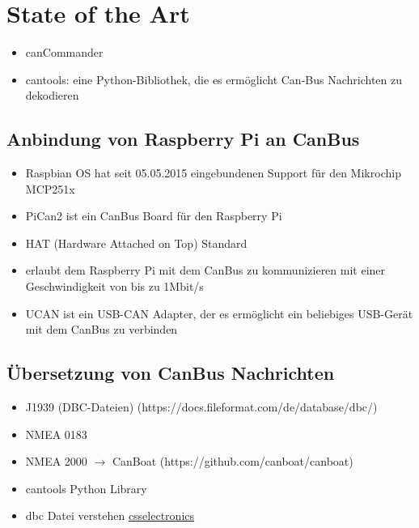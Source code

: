 \section{State of the Art}
\begin{itemize}
    \item canCommander
    \item cantools: eine Python-Bibliothek, die es ermöglicht Can-Bus Nachrichten zu dekodieren
\end{itemize}
\subsection{Anbindung von Raspberry Pi an CanBus}
\begin{itemize}
    \item Raspbian OS hat seit 05.05.2015 eingebundenen Support für den Mikrochip MCP251x
\end{itemize}
\cite{Salunkhe2016}
\begin{itemize}
    \item PiCan2 ist ein CanBus Board für den Raspberry Pi
    \item HAT (Hardware Attached on Top) Standard
    \item erlaubt dem Raspberry Pi mit dem CanBus zu kommunizieren mit einer Geschwindigkeit von bis zu 1Mbit/s
    \item UCAN ist ein USB-CAN Adapter, der es ermöglicht ein beliebiges USB-Gerät mit dem CanBus zu verbinden
\end{itemize}
\cite{Pant2019}
\subsection{Übersetzung von CanBus Nachrichten}
\begin{itemize}
    \item J1939 (DBC-Dateien) (https://docs.fileformat.com/de/database/dbc/)
    \item NMEA 0183 
    \item NMEA 2000 $\rightarrow$ CanBoat (https://github.com/canboat/canboat)
    \item cantools Python Library 
    \item dbc Datei verstehen \href{https://www.csselectronics.com/pages/can-dbc-file-database-intro}{csselectronics}
\end{itemize}